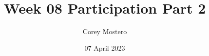\documentclass{article}
\begin{document}
\title{Week 08 Participation Part 2}
\date{07 April 2023}
\author{Corey Mostero}

\newcommand{\hr}{\par\noindent\rule{\textwidth}{0.4pt}}

\newcommand{\bc}[1]{
	\begin{equation*}
		\begin{boxed}
			{#1}
		\end{boxed}
	\end{equation*}
}

\newcommand{\cond}[2]{
	\ifmmode
		{#1} \quad {#2}
	\else
		$$ {#1} \quad {#2} $$
	\fi
}

\newcommand{\R}[1]{\mathbb{R}^{#1}}

\maketitle
\newpage

\tableofcontents
\end{document}
